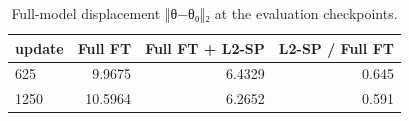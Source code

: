\begin{table}[t]
\centering\small
\begin{tabular}{lrrr}
\toprule
update & Full FT & Full FT + L2-SP & L2-SP / Full FT \\
\midrule
625 & 9.9675 & 6.4329 & 0.645 \\
1250 & 10.5964 & 6.2652 & 0.591 \\
\bottomrule
\end{tabular}
\caption{Full-model displacement ‖θ−θ₀‖₂ at the evaluation checkpoints.}
\label{tab:task1_displacement}
\end{table}
